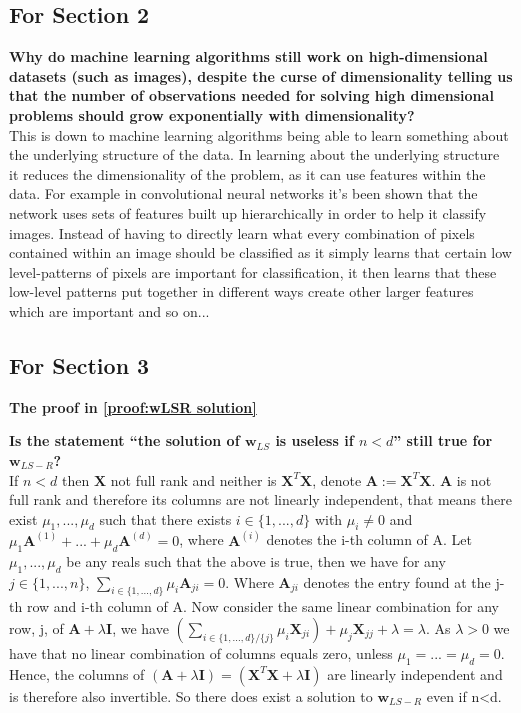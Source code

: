 \begin{appendices}
\subsection{For Section 2}
\begin{question}
    \textbf{Why do machine learning algorithms still work on high-dimensional datasets (such as images), despite the curse of dimensionality telling us that the number of observations needed for solving high dimensional problems should grow exponentially with dimensionality?} \\
    This is down to machine learning algorithms being able to learn something about the underlying structure of the data. In learning about the underlying structure it reduces the dimensionality of the problem, as it can use features within the data. For example in convolutional neural networks it's been shown that the network uses sets of features built up hierarchically in order to help it classify images. Instead of having to directly learn what every combination of pixels contained within an image should be classified as it simply learns that certain low level-patterns of pixels are important for classification, it then learns that these low-level patterns put together in different ways create other larger features which are important and so on...
\end{question}


\subsection{For Section 3}
\begin{question}
    \textbf{The proof in \cref{proof:wLSR solution}}
\end{question}

\begin{question}
    \textbf{Is the statement ``the solution of $\bm{w}_{LS}$ is useless if $n<d$'' still true for $\bm{w}_{LS-R}$?} \\
    If $n<d$ then $\bm{X}$ not full rank and neither is $\bm{X}^{T} \bm{X}$, denote $\bm{A}:=\bm{X}^{T} \bm{X}$. $\bm{A}$ is not full rank and therefore its columns are not linearly independent, that means there exist $\mu_{1}, ..., \mu_{d}$ such that there exists $i \in \{1,...,d\}$ with $\mu_{i} \neq0$ and $\mu_{1} \bm{A}^{(1)} + ... + \mu_{d} \bm{A}^{(d)} = 0$, where $\bm{A}^{(i)}$ denotes the i-th column of A. Let $\mu_{1}, ..., \mu_{d}$ be any reals such that the above is true, then we have for any $j \in \{1,...,n\}$, $\sum_{i \in \{1,...,d\}} \mu_{i} \bm{A}_{ji} = 0$. Where $\bm{A}_{ji}$ denotes the entry found at the j-th row and i-th column of A. Now consider the same linear combination for any row, j, of $\bm{A} + \lambda \bm{I}$, we have $(\sum_{i \in \{1,...,d\} / \{j\} } \mu_{i} \bm{X}_{ji}) + \mu_{j} \bm{X}_{jj} + \lambda = \lambda $. As $\lambda>0$ we have that no linear combination of columns equals zero, unless $\mu_{1} = ...= \mu_{d}=0$. Hence, the columns of $(\bm{A} + \lambda \bm{I}) = (\bm{X}^{T} \bm{X} + \lambda \bm{I})$ are linearly independent and is therefore also invertible. So there does exist a solution to $\bm{w}_{LS-R}$ even if n<d.
\end{question}


\end{appendices}
